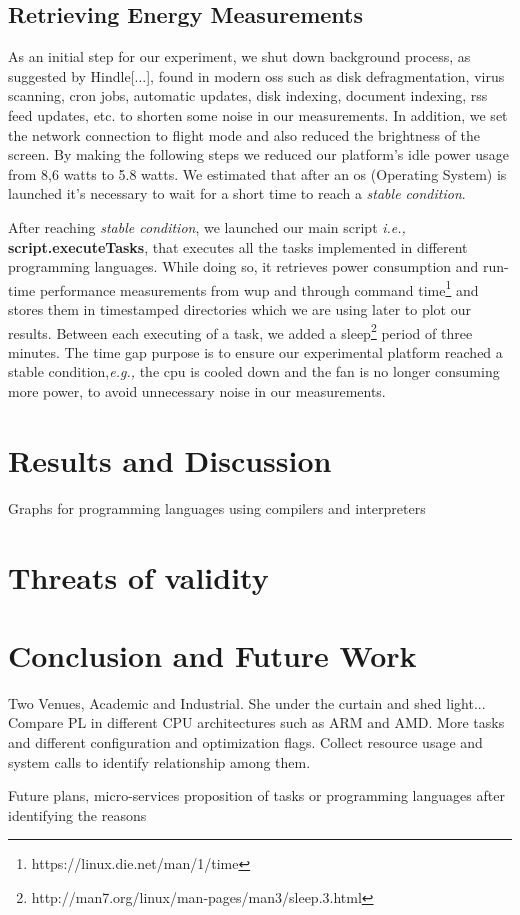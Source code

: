 \subsection{Retrieving Energy Measurements} 
As an initial step for our experiment, we shut down background 
process, as suggested by Hindle[...], found in modern {\sc os}s such as disk 
defragmentation, virus scanning, {\sc cron} jobs, automatic updates, 
disk indexing, document indexing, {\sc rss} feed updates, etc. to 
shorten some noise in our measurements. 
In addition, we set the network connection to flight mode and 
also reduced the brightness of the screen.
By making the following steps we reduced our platform's idle 
power usage from 8,6 watts to 5.8 watts. 
We estimated that after an {\sc os} (Operating System) is launched 
it's necessary to wait for a short time to reach a 
\textit{stable condition}.

After reaching \textit{stable condition}, we launched our main 
script \textit{i.e.,} \textbf{script.executeTasks}, that executes 
all the tasks implemented in different programming languages. 
While doing so, it retrieves power consumption and run-time 
performance measurements from {\sc wup} and through command 
time\footnote{https://linux.die.net/man/1/time} and stores them 
in timestamped directories which we are using later to plot 
our results. 
Between each executing of a task, we added a 
sleep\footnote{http://man7.org/linux/man-pages/man3/sleep.3.html} 
period of three minutes. 
The time gap purpose is to ensure our experimental platform 
reached a stable condition,\textit{e.g.,} the {\sc cpu} is cooled 
down and the fan is no longer consuming more power, to avoid 
unnecessary noise in our measurements.

\section{Results and Discussion} \label{results_and_discussion}
Graphs for programming languages using compilers and interpreters

\section{Threats of validity} \label{threats_of_validity}

\section{Conclusion and Future Work} \label{conclusiona_and_future_work}
Two Venues, Academic and Industrial.
She under the curtain and shed light... 
Compare PL in different CPU architectures such as 
ARM and AMD.
More tasks and different configuration and optimization 
flags.
Collect resource usage and system calls to identify 
relationship among them.

Future plans, micro-services proposition of tasks or 
programming languages after identifying the reasons



